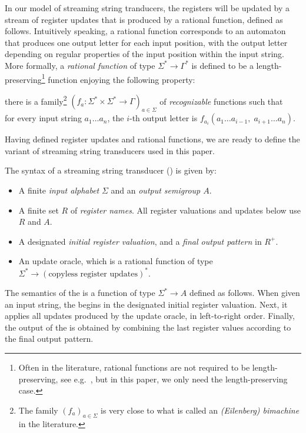 In our model of streaming string tranducers, the registers will be updated by a
stream of register updates that is produced by a {rational function}, defined as
follows. Intuitively speaking, a rational function corresponds to an automaton
that produces one output letter for each input position, with the output letter
depending on regular properties of the input position within the input string.
More formally, a \emph{rational function} of type $\Sigma^* \to \Gamma^*$ is
defined to be a length-preserving\footnote{Often in the literature, rational
  functions are not required to be length-preserving, see
  e.g.~\cite[p.~525]{sakarovitch2009elements}, but in this paper, we only need
  the length-preserving case.} function enjoying the following property:
\begin{center}
  there is a family\footnote{The family $(f_a)_{a\in\Sigma}$ is very close to what is called an \emph{(Eilenberg) bimachine} in the literature.} $(f_a \colon \Sigma^* \times \Sigma^* \to \Gamma)_{a \in \Sigma}$ of \emph{recognizable} functions such that\\
  for every input string $a_1 \dots a_n$, the $i$-th output letter is $f_{a_i}(a_1 \dots a_{i-1},\; a_{i+1} \dots a_n)$.
\end{center}
Having defined register updates and rational functions, we are ready to define the variant of streaming string transducers used in this paper.

\begin{definition}\label{def:usual-sst}
    The syntax of a streaming string transducer (\sst) is given by:
\begin{itemize}
    \item A finite \emph{input alphabet} $\Sigma$ and an \emph{output semigroup $A$}.
    \item A finite set $R$ of \emph{register names}. All register valuations and updates below use $R$ and $A$.
    \item A designated \emph{initial register valuation}, and a \emph{final output pattern} in $R^+$.
    \item An update oracle, which is a rational function of type 
        $\Sigma^* \to (\text{copyless register updates})^*$.
\end{itemize}
\end{definition}
The semantics of the \sst{} is a function of type $\Sigma^* \to A$ defined as follows. When given an input string, the \sst{} begins in the designated initial register valuation. Next, it applies all updates produced by the update oracle, in left-to-right order. Finally, the output of the \sst{} is obtained by combining the last register values according to the final output pattern.

